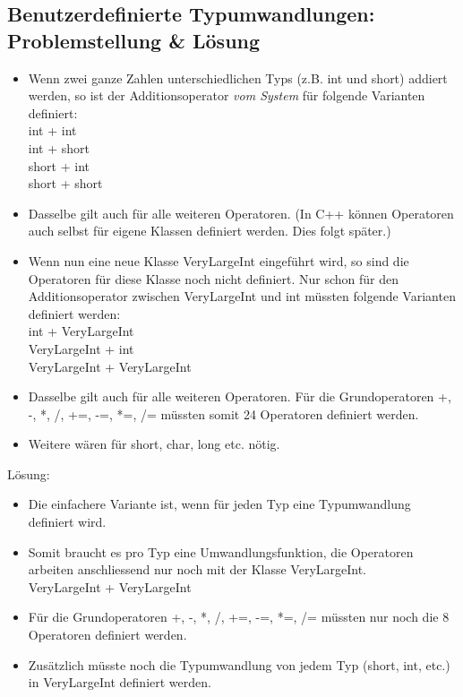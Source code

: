 \subsection{Benutzerdefinierte Typumwandlungen: Problemstellung \& Lösung}
\label{sec:Benutzerdefinierte Typumwandlungen: Problemstellung}
\begin{itemize}
	\item Wenn zwei ganze Zahlen unterschiedlichen Typs (z.B. int und short) addiert werden, so ist der Additionsoperator \textit{vom System} für folgende Varianten definiert:\\
	int + int\\
	int + short\\
	short + int\\
	short + short
	\item Dasselbe gilt auch für alle weiteren Operatoren. (In C++ können Operatoren auch selbst für eigene Klassen definiert werden. Dies folgt später.)
	\item Wenn nun eine neue Klasse VeryLargeInt eingeführt wird, so sind die Operatoren für diese Klasse noch nicht definiert. Nur schon für den Additionsoperator zwischen VeryLargeInt und int müssten folgende Varianten definiert werden:\\
	int + VeryLargeInt\\
	VeryLargeInt + int\\
	VeryLargeInt + VeryLargeInt
	\item Dasselbe gilt auch für alle weiteren Operatoren. Für die Grundoperatoren +, -, *, /, +=, -=, *=, /= müssten somit 24 Operatoren definiert werden.
	\item Weitere wären für short, char, long etc. nötig.
\end{itemize}
Lösung:
\begin{itemize}
	\item Die einfachere Variante ist, wenn für jeden Typ eine Typumwandlung definiert wird.
	\item Somit braucht es pro Typ eine Umwandlungsfunktion, die Operatoren arbeiten anschliessend nur noch mit der Klasse VeryLargeInt.\\
	VeryLargeInt + VeryLargeInt
	\item Für die Grundoperatoren +, -, *, /, +=, -=, *=, /= müssten nur noch die 8 Operatoren definiert werden.
	\item Zusätzlich müsste noch die Typumwandlung von jedem Typ (short, int, etc.) in VeryLargeInt definiert werden. 
\end{itemize}

